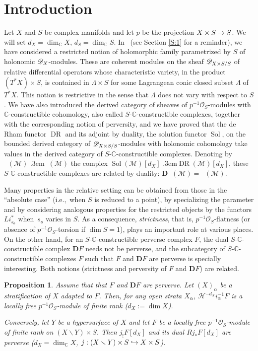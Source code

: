 \documentclass[english]{smfart}
\numberwithin{subsection}{section}
\def\shh{\mathcal{H}}
\def\shh{\mathcal{H}}
\def\shm{\mathcal{M}}
\def\sho{\mathcal{O}}\let\cO\sho
\newcommand{\C}{\mathbb{C}}\let\CC\C
\newcommand{\bD}{\boldsymbol{D}}
\newcommand{\XS}{X\times S}
\DeclareMathOperator{\DR}{DR}
\DeclareMathOperator{\pDR}{{}^\mathrm{p}DR}
\DeclareMathOperator{\Sol}{Sol}
\DeclareMathOperator{\pSol}{{}^\mathrm{p}Sol}
\let\setminus\smallsetminus
\def\ie{i.e.,\ }
\def\resp{\text{resp.}\kern.3em}
\newcommand{\pOS}{p^{-1}\sho_S}
\numberwithin{equation}{section}
\theoremstyle{plain}
\newtheorem{propositionintro}[theoremintro]{Proposition}
\theoremstyle{definition}
\def\to{\mathchoice{\longrightarrow}{\rightarrow}{\rightarrow}{\rightarrow}}
\def\hto{\mathrel{\lhook\joinrel\to}}
\begin{document}
\section*{Introduction}
Let $X$ and $S$ be complex manifolds and let $p$ be the projection $\XS\to S$. We will set $d_X=\dim_\CC X$, $d_S=\dim_\CC S$. In~\cite{MF-S12} (see Section \ref{S:1} for a reminder), we have considered a restricted notion of holomorphic family parametrized by $S$ of holonomic $\cD_X$-modules. These are coherent modules on the sheaf $\cD_{\XS/S}$ of relative differential operators whose characteristic variety, in the product $(T^*X)\times S$, is contained in $\Lambda\times S$ for some Lagrangean conic closed subset $\Lambda$ of $T^*X$. This notion is restrictive in the sense that $\Lambda$ does not vary with respect to $S$. We have also introduced the derived category of sheaves of $\pOS$-modules with $\C$\nobreakdash-constructible cohomology, also called $S$-$\C$-constructible complexes, together with the corresponding notion of perversity, and we have proved that the de\,Rham functor $\DR$ and its adjoint by duality, the solution functor $\Sol$, on the bounded derived category of $\cD_{\XS/S}$-modules with holonomic cohomology take values in the derived category of $S$-$\C$-constructible complexes. Denoting by $\pSol(\shm)$ \resp $\pDR(\shm)$ the complex $\Sol(\shm)[d_X]$ \resp $\DR(\shm)[d_X]$, these $S$-$\CC$-constructible complexes are related by duality: $\bD\pSol(\shm)=\pDR(\shm)$.

Many properties in the relative setting can be obtained from those in the ``absolute case'' (\ie when $S$ is reduced to a point), by specializing the parameter and by considering analogous properties for the restricted objects by the functors $Li_{s_o}^*$ when~$s_o$ varies in $S$. As a consequence, \emph{strictness}, that is, $\pOS$-flatness (or absence of $\pOS$-torsion if $\dim S=1$), plays an important role at various places. On the other hand, for an $S$-$\C$-constructible perverse complex $F$, the dual $S$-$\C$-constructible complex $\bD F$ needs not be perverse, and the subcategory of $S$-$\C$-constructible complexes $F$ such that $F$ and $\bD F$ are perverse is specially interesting. Both notions (strictness and perversity of $F$ and $\bD F$) are related.\enlargethispage{1.5\baselineskip}%

\begin{propositionintro}\label{prop:FDFperverse}
Assume that that $F$ and $\bD F$ are perverse. Let $(X)_{\alpha}$ be a stratification of $X$ adapted to $F$. Then, for any open strata $X_{\alpha}$, $\shh^{-d_X}i^{-1}_{\alpha}F$ is a locally free $\pOS$-module of finite rank ($d_X:=\dim X$).

Conversely, let $Y$ be a hypersurface of $X$ and let $F$ be a locally free $\pOS$-module of finite rank on $(X\setminus Y)\times S$. Then $j_!F[d_X]$ and its dual $Rj_*F[d_X]$ are perverse ($d_X=\dim_\CC X$, $j:(X\setminus Y)\times S\hto\XS$).
\end{propositionintro}
\end{document}
